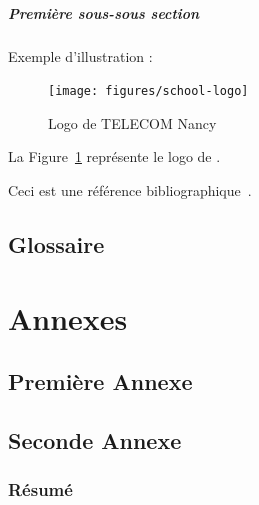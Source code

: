 \documentclass{tnreport}
\begin{document}
\subsubsection{Première sous-sous section}

Exemple d'illustration :

\begin{figure}[h]
  \centering
  \texttt{[image: figures/school-logo]}
  \caption{Logo de TELECOM Nancy}
  \label{fig:logo-tn}
\end{figure}

La Figure~\ref{fig:logo-tn} représente le logo de \reportSchool{}.

Ceci est une référence bibliographique~\cite{GOT4}.

\cleardoublepage
\renewcommand{\tocbibname}{Bibliographie / Webographie}


\cleardoublepage

\listoffigures
\cleardoublepage

\listoftables
\cleardoublepage

\lstlistoflistings
\cleardoublepage

\chapter*{Glossaire}

\cleardoublepage
\renewcommand{\thesubsection}{\Roman{subsection}}

\appendix
\part*{Annexes}
\cleardoublepage

\chapter{Première Annexe}
\cleardoublepage

\chapter{Seconde Annexe}


\cleardoublepage
\thispagestyle{empty}

\section*{Résumé}
\end{document}
